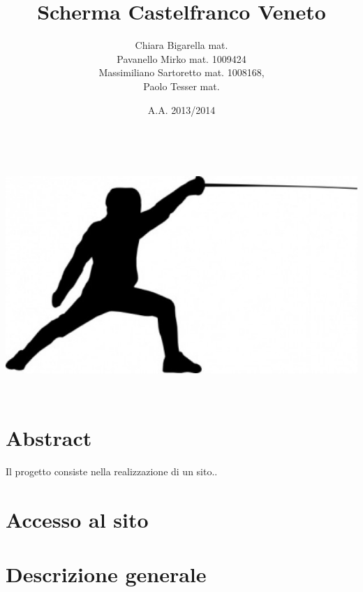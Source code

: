 
	
\title{\bfseries Scherma Castelfranco Veneto}
\author{Chiara Bigarella mat. \\Pavanello Mirko mat. 1009424 \\Massimiliano Sartoretto mat. 1008168,\\ Paolo Tesser mat. }
\date{A.A. 2013/2014}


\maketitle
\vspace {20 mm}
\includegraphics[width=150mm, height=90mm]{images/frontImage.png}

\pagestyle{romano}
\newpage
	\tableofcontents
\newpage
	\listoffigures
\newpage
{}
\pagestyle{std}

\section{Abstract}
Il progetto consiste nella realizzazione di un sito..

\newpage
\section{Accesso al sito}
	

\newpage
\section{Descrizione generale}
	
	
